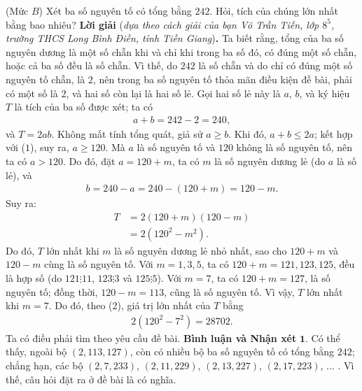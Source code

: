 \begin{multicols}{2}
	\setlength{\abovedisplayskip}{4pt}
	\setlength{\belowdisplayskip}{4pt}
	{}
	(Mức $B$) Xét ba số nguyên tố có tổng bằng $242$. Hỏi,  tích của chúng lớn nhất bằng bao nhiêu?
	\vskip 0.05cm
	\textbf{\color{thachthuctoanhoc}Lời giải} (\textit{dựa theo cách giải của bạn Võ Trần Tiến, lớp $8^5$, trường THCS Long Bình Điền, tỉnh Tiền Giang})\textbf{\color{thachthuctoanhoc}.}
	\vskip 0.05cm
	Ta biết rằng, tổng của ba số nguyên dương là một số chẵn khi và chỉ khi trong ba số đó, có đúng một số chẵn, hoặc cả ba số đều là số chẵn. Vì thế, do $242$ là số chẵn và do chỉ có đúng một số nguyên tố chẵn, là $2$, nên trong ba số nguyên tố thỏa mãn điều kiện đề bài, phải có một số là $2$, và hai số còn lại là hai số lẻ. Gọi hai số lẻ này là $a$, $b$, và ký hiệu $T$ là tích của ba số được xét; ta có
	\begin{align*}
		a + b = 242 - 2 = 240,                          \tag{$1$}
	\end{align*}
	và $T = 2ab$.
	\vskip 0.05cm
	Không mất tính tổng quát, giả sử $a \ge b$. Khi đó, $a + b \le 2a$; kết hợp với ($1$), suy ra, $a \ge 120$. Mà $a$ là số nguyên tố và $120$ không là số nguyên tố, nên ta có $a > 120$. Do đó, đặt $a = 120 + m$, ta có $m$ là số nguyên dương lẻ (do $a$ là số lẻ), và
	\begin{align*}
		b = 240 - a = 240 - (120 + m) = 120 - m.
	\end{align*}
	Suy ra:
	\begin{align*}
		T &= 2\left( {120 + m} \right)\left( {120 - m} \right) \\
		&= 2\left( {{{120}^2} - {m^2}} \right). \tag{$2$}
	\end{align*}
	Do đó, $T$ lớn nhất khi $m$ là số nguyên dương lẻ nhỏ nhất, sao cho $120 + m$ và $120 - m$ cùng là số nguyên tố.
	\vskip 0.05cm
	Với $m \!=\! 1, 3, 5$, ta có $120 \!+\! m \!=\! 121, 123, 125$, đều là hợp số (do  $121 \vdots 11$, $123  \vdots  3$  và  $125 \vdots 5$).
	\vskip 0.05cm
	Với $m = 7$, ta có $120 + m = 127$, là số nguyên tố; đồng thời, $120 - m = 113$, cũng là số nguyên tố.
	\vskip 0.05cm
	Vì vậy, $T$ lớn nhất khi $m = 7$. Do đó, theo ($2$), giá trị lớn nhất của $T$ bằng
	\begin{align*}
		2\left( {{{120}^2} - {7^2}} \right) = 28702.
	\end{align*}
	Ta có điều phải tìm theo yêu cầu đề bài.
	\vskip 0.05cm
	\textbf{\color{thachthuctoanhoc}Bình luận và Nhận xét}
	\vskip 0.05cm	
	$\pmb{1.}$ Có thể thấy, ngoài bộ $(2, 113, 127)$, còn có nhiều bộ ba số nguyên tố có tổng bằng $242$; chẳng hạn, các bộ $(2, 7, 233)$, $(2, 11, 229)$, $(2, 13, 227)$, $(2, 17, 223)$, $\ldots$ . Vì thế, câu hỏi đặt ra ở đề bài là có nghĩa.

\end{multicols}
